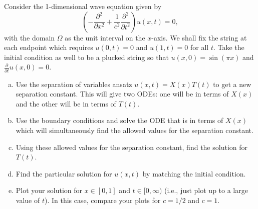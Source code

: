 \documentclass[12pt]{article} %
\begin{document}
\begin{problem}
    Consider the 1-dimensional wave equation given by
    \[
    \left( - \frac{\partial^2}{\partial x^2} +\frac{1}{c^2} \frac{\partial^2}{\partial t^2} \right) u(x,t) =0,
    \]
    with the domain $\Omega$ as the unit interval on the $x$-axis.  We shall fix the string at each endpoint which requires $u(0,t)=0$ and $u(1,t)=0$ for all $t$.  Take the initial condition as well to be a plucked string so that $u(x,0)=\sin(\pi x)$ and $\frac{\partial}{\partial t}u(x,0)=0$. 
    \begin{enumerate}[(a)]
        \item Use the separation of variables ansatz $u(x,t)=X(x)T(t)$ to get a new separation constant. This will give two ODEs: one will be in terms of $X(x)$ and the other will be in terms of $T(t)$.
        \item Use the boundary conditions and solve the ODE that is in terms of $X(x)$ which will simultaneously find the allowed values for the separation constant.
        \item Using these allowed values for the separation constant, find the solution for $T(t)$.
        \item Find the particular solution for $u(x,t)$ by matching the initial condition.
        \item Plot your solution for $x\in [0,1]$ and $t\in [0,\infty)$ (i.e., just plot up to a large value of $t$). In this case, compare your plots for $c=1/2$ and $c=1$.
    \end{enumerate}
\end{problem}
\end{document}
